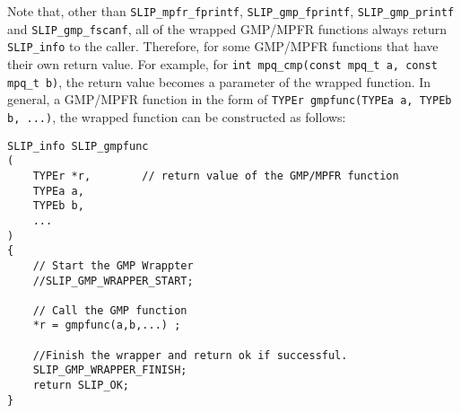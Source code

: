\documentclass[12pt]{article}
\theoremstyle{definition}
\begin{document}
Note that, other than \verb|SLIP_mpfr_fprintf|, \verb|SLIP_gmp_fprintf|,
\verb|SLIP_gmp_printf| and \verb|SLIP_gmp_fscanf|, all of the wrapped GMP/MPFR
functions always return \verb|SLIP_info| to the caller. Therefore, for some
GMP/MPFR functions that have their own return value.  For example, for
\verb|int mpq_cmp(const mpq_t a, const mpq_t b)|, the return value becomes a
parameter of the wrapped function. In general, a GMP/MPFR function in the form
of \verb|TYPEr gmpfunc(TYPEa a, TYPEb b, ...)|, the wrapped
function can be constructed as follows:

\begin{mdframed}[userdefinedwidth=6in]
{\footnotesize
\begin{verbatim}
SLIP_info SLIP_gmpfunc
(
    TYPEr *r,        // return value of the GMP/MPFR function
    TYPEa a,
    TYPEb b,
    ...
)
{
    // Start the GMP Wrappter
    //SLIP_GMP_WRAPPER_START;

    // Call the GMP function
    *r = gmpfunc(a,b,...) ;

    //Finish the wrapper and return ok if successful.
    SLIP_GMP_WRAPPER_FINISH;
    return SLIP_OK;
}
\end{verbatim}
} \end{mdframed}
\end{document}

